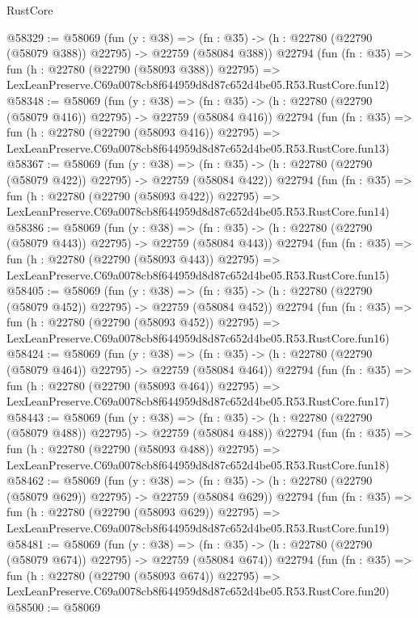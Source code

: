 \begin{lexlean}{RustCore}
\begin{coremodule}
@58329 := @58069
    (fun (y : @38) =>
    (fn : @35) -> (h : @22780 (@22790 (@58079 @388)) @22795) -> @22759 (@58084 @388))
    @22794
    (fun (fn : @35) =>
    fun (h : @22780 (@22790 (@58093 @388)) @22795) =>
    LexLeanPreserve.C69a0078cb8f644959d8d87c652d4be05.R53.RustCore.fun12)
@58348 := @58069
    (fun (y : @38) =>
    (fn : @35) -> (h : @22780 (@22790 (@58079 @416)) @22795) -> @22759 (@58084 @416))
    @22794
    (fun (fn : @35) =>
    fun (h : @22780 (@22790 (@58093 @416)) @22795) =>
    LexLeanPreserve.C69a0078cb8f644959d8d87c652d4be05.R53.RustCore.fun13)
@58367 := @58069
    (fun (y : @38) =>
    (fn : @35) -> (h : @22780 (@22790 (@58079 @422)) @22795) -> @22759 (@58084 @422))
    @22794
    (fun (fn : @35) =>
    fun (h : @22780 (@22790 (@58093 @422)) @22795) =>
    LexLeanPreserve.C69a0078cb8f644959d8d87c652d4be05.R53.RustCore.fun14)
@58386 := @58069
    (fun (y : @38) =>
    (fn : @35) -> (h : @22780 (@22790 (@58079 @443)) @22795) -> @22759 (@58084 @443))
    @22794
    (fun (fn : @35) =>
    fun (h : @22780 (@22790 (@58093 @443)) @22795) =>
    LexLeanPreserve.C69a0078cb8f644959d8d87c652d4be05.R53.RustCore.fun15)
@58405 := @58069
    (fun (y : @38) =>
    (fn : @35) -> (h : @22780 (@22790 (@58079 @452)) @22795) -> @22759 (@58084 @452))
    @22794
    (fun (fn : @35) =>
    fun (h : @22780 (@22790 (@58093 @452)) @22795) =>
    LexLeanPreserve.C69a0078cb8f644959d8d87c652d4be05.R53.RustCore.fun16)
@58424 := @58069
    (fun (y : @38) =>
    (fn : @35) -> (h : @22780 (@22790 (@58079 @464)) @22795) -> @22759 (@58084 @464))
    @22794
    (fun (fn : @35) =>
    fun (h : @22780 (@22790 (@58093 @464)) @22795) =>
    LexLeanPreserve.C69a0078cb8f644959d8d87c652d4be05.R53.RustCore.fun17)
@58443 := @58069
    (fun (y : @38) =>
    (fn : @35) -> (h : @22780 (@22790 (@58079 @488)) @22795) -> @22759 (@58084 @488))
    @22794
    (fun (fn : @35) =>
    fun (h : @22780 (@22790 (@58093 @488)) @22795) =>
    LexLeanPreserve.C69a0078cb8f644959d8d87c652d4be05.R53.RustCore.fun18)
@58462 := @58069
    (fun (y : @38) =>
    (fn : @35) -> (h : @22780 (@22790 (@58079 @629)) @22795) -> @22759 (@58084 @629))
    @22794
    (fun (fn : @35) =>
    fun (h : @22780 (@22790 (@58093 @629)) @22795) =>
    LexLeanPreserve.C69a0078cb8f644959d8d87c652d4be05.R53.RustCore.fun19)
@58481 := @58069
    (fun (y : @38) =>
    (fn : @35) -> (h : @22780 (@22790 (@58079 @674)) @22795) -> @22759 (@58084 @674))
    @22794
    (fun (fn : @35) =>
    fun (h : @22780 (@22790 (@58093 @674)) @22795) =>
    LexLeanPreserve.C69a0078cb8f644959d8d87c652d4be05.R53.RustCore.fun20)
@58500 := @58069

\end{coremodule}
\end{lexlean}
